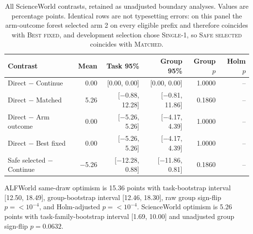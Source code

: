 \begin{table}[ht]
\caption{All ScienceWorld contrasts, retained as unadjusted boundary analyses. Values are percentage points. Identical rows are not typesetting errors: on this panel the arm-outcome forest selected arm 2 on every eligible prefix and therefore coincides with \textsc{Best fixed}, and development selection chose \textsc{Single-1}, so \textsc{Safe selected} coincides with \textsc{Matched}.}
\label{tab:scienceworld-contrasts}
\centering
\scriptsize
\begin{tabular}{@{}lrrrrr@{}}
\toprule
Contrast & Mean & Task 95\% & Group 95\% & Group $p$ & Holm $p$ \\
\midrule
Direct $-$ Continue & 0.00 & [0.00, 0.00] & [0.00, 0.00] & 1.0000 & -- \\
Direct $-$ Matched & 5.26 & [$-$0.88, 12.28] & [$-$0.81, 11.86] & 0.1860 & -- \\
Direct $-$ Arm outcome & 0.00 & [$-$5.26, 5.26] & [$-$4.17, 4.39] & 1.0000 & -- \\
Direct $-$ Best fixed & 0.00 & [$-$5.26, 5.26] & [$-$4.17, 4.39] & 1.0000 & -- \\
Safe selected $-$ Continue & $-$5.26 & [$-$12.28, 0.88] & [$-$11.86, 0.81] & 0.1860 & -- \\
\bottomrule
\end{tabular}
\end{table}

ALFWorld same-draw optimism is 15.36 points with task-bootstrap interval [12.50, 18.49], group-bootstrap interval [12.46, 18.30], raw group sign-flip $p=<10^{-4}$, and Holm-adjusted $p=<10^{-4}$. ScienceWorld optimism is 5.26 points with task-family-bootstrap interval [1.69, 10.00] and unadjusted group sign-flip $p=0.0632$.

